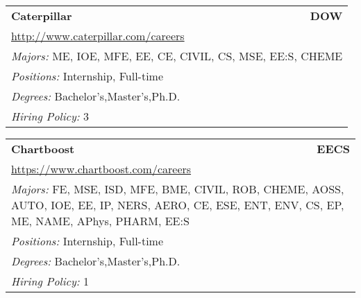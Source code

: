 \documentclass[twoside]{article}
\begin{document}
\begin{center}
\begin{multicols}{3}
\begin{FlushLeft}
\begin{minipage}{\columnwidth}
\end{minipage}
 
\begin{minipage}{\columnwidth}\begin{tabularx}{.95\columnwidth}{Xr}
                 {\Large\bf Caterpillar} & {\Large\bf DOW}\\
    \multicolumn{2}{p{.95\columnwidth}}{\url{http://www.caterpillar.com/careers}}\\
    \multicolumn{2}{p{.95\columnwidth}}{\emph{Majors:} ME, IOE, MFE, EE, CE, CIVIL, CS, MSE, EE:S, CHEME}\\
    \multicolumn{2}{p{.95\columnwidth}}{\emph{Positions:} Internship, Full-time}\\
    \multicolumn{2}{p{.95\columnwidth}}{\emph{Degrees:} Bachelor's,Master's,Ph.D.}\\
    \multicolumn{2}{p{.95\columnwidth}}{\emph{Hiring Policy:} 3}\\
    \end{tabularx}
    
\end{minipage}
 
\begin{minipage}{\columnwidth}\begin{tabularx}{.95\columnwidth}{Xr}
                 {\Large\bf Chartboost} & {\Large\bf EECS}\\
    \multicolumn{2}{p{.95\columnwidth}}{\url{https://www.chartboost.com/careers}}\\
    \multicolumn{2}{p{.95\columnwidth}}{\emph{Majors:} FE, MSE, ISD, MFE, BME, CIVIL, ROB, CHEME, AOSS, AUTO, IOE, EE, IP, NERS, AERO, CE, ESE, ENT, ENV, CS, EP, ME, NAME, APhys, PHARM, EE:S}\\
    \multicolumn{2}{p{.95\columnwidth}}{\emph{Positions:} Internship, Full-time}\\
    \multicolumn{2}{p{.95\columnwidth}}{\emph{Degrees:} Bachelor's,Master's,Ph.D.}\\
    \multicolumn{2}{p{.95\columnwidth}}{\emph{Hiring Policy:} 1}\\
    \end{tabularx}
    
\end{minipage}
 

\end{FlushLeft}
\end{multicols}
\end{center}
\end{document}
